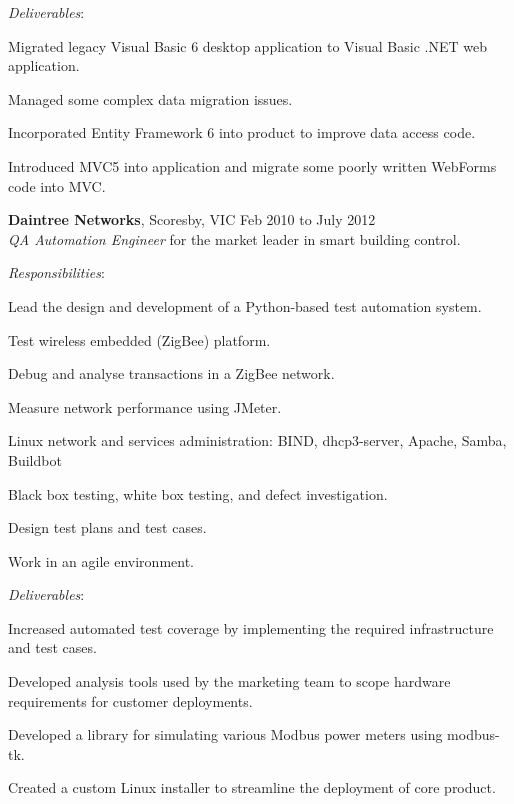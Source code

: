 \documentclass[line,margin]{res}
\begin{document}
\begin{resume}
        \textit{Deliverables}:
        \begin{list}{}{\leftmargin=1em \itemsep=-2pt}
            \item{Migrated legacy Visual Basic 6 desktop application to Visual Basic .NET web application.}
            \item{Managed some complex data migration issues.}
            \item{Incorporated Entity Framework 6 into product to improve data access code.}
            \item{Introduced MVC5 into application and migrate some poorly written WebForms code
            into MVC.}
        \end{list}

        \textbf{Daintree Networks}, Scoresby, VIC \hfill Feb 2010 to July 2012 \\
        \textit{QA Automation Engineer} for the market leader in smart building control.

        \textit{Responsibilities}:
        \begin{list}{}{\leftmargin=1em \itemsep=-2pt}
            \item{Lead the design and development of a Python-based test automation system.}
            \item{Test wireless embedded (ZigBee) platform.}
            \item{Debug and analyse transactions in a ZigBee network.}
            \item{Measure network performance using JMeter.}
            \item{Linux network and services administration: BIND, dhcp3-server, Apache, Samba, Buildbot}
            \item{Black box testing, white box testing, and defect investigation.}
            \item{Design test plans and test cases.}
            \item{Work in an agile environment.}
        \end{list}
             
        \textit{Deliverables}:
        \begin{list}{}{\leftmargin=1em \itemsep=-2pt}
            \item{Increased automated test coverage by implementing the required infrastructure and
            test cases.}
            \item{Developed analysis tools used by the marketing team to scope hardware
            requirements for customer deployments.}
            \item{Developed a library for simulating various Modbus power meters using modbus-tk.}
            \item{Created a custom Linux installer to streamline the deployment of core product.}
        \end{list}


\end{resume}
\end{document}
